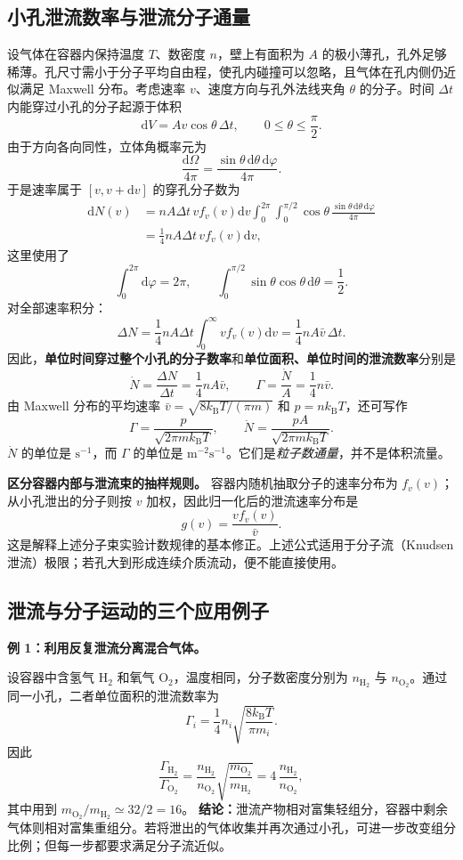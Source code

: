 \documentclass[11pt,a4paper,openany]{ctexbook}
\newcommand{\dd}{\mathrm d}
\newcommand{\kb}{k_{\mathrm B}}
\begin{document}
\subsection*{小孔泄流数率与泄流分子通量}
设气体在容器内保持温度 $T$、数密度 $n$，壁上有面积为 $A$ 的极小薄孔，孔外足够稀薄。孔尺寸需小于分子平均自由程，使孔内碰撞可以忽略，且气体在孔内侧仍近似满足 Maxwell 分布。考虑速率 $v$、速度方向与孔外法线夹角 $\theta$ 的分子。时间 $\Delta t$ 内能穿过小孔的分子起源于体积
\[
\dd V=A v\cos\theta\,\Delta t,\qquad 0\le\theta\le\frac{\pi}{2}.
\]
由于方向各向同性，立体角概率元为
\[
\frac{\dd\Omega}{4\pi}
=\frac{\sin\theta\,\dd\theta\,\dd\varphi}{4\pi}.
\]
于是速率属于 $[v,v+\dd v]$ 的穿孔分子数为
\[
\begin{aligned}
\dd N(v)
&=nA\Delta t\,v f_v(v)\dd v
\int_0^{2\pi}\!\!\int_0^{\pi/2}
\cos\theta\,\frac{\sin\theta\,\dd\theta\,\dd\varphi}{4\pi}\\
&=\frac14 nA\Delta t\,v f_v(v)\dd v,
\end{aligned}
\]
这里使用了
\[
\int_0^{2\pi}\dd\varphi=2\pi,\qquad
\int_0^{\pi/2}\sin\theta\cos\theta\,\dd\theta=\frac12.
\]
对全部速率积分：
\[
\Delta N=\frac14nA\Delta t\int_0^\infty vf_v(v)\dd v
=\frac14nA\bar v\,\Delta t.
\]
因此，\textbf{单位时间穿过整个小孔的分子数率}和\textbf{单位面积、单位时间的泄流数率}分别是
\[
\boxed{\dot N=\frac{\Delta N}{\Delta t}=\frac14nA\bar v},
\qquad
\boxed{\Gamma=\frac{\dot N}{A}=\frac14n\bar v}.
\]
由 Maxwell 分布的平均速率
$\bar v=\sqrt{8\kb T/(\pi m)}$ 和 $p=n\kb T$，还可写作
\[
\Gamma=\frac{p}{\sqrt{2\pi m\kb T}},\qquad
\dot N=\frac{pA}{\sqrt{2\pi m\kb T}}.
\]
$\dot N$ 的单位是 $\mathrm{s^{-1}}$，而 $\Gamma$ 的单位是
$\mathrm{m^{-2}s^{-1}}$。它们是\emph{粒子数通量}，并不是体积流量。

\begin{notebox}
\textbf{区分容器内部与泄流束的抽样规则。}
容器内随机抽取分子的速率分布为 $f_v(v)$；从小孔泄出的分子则按 $v$ 加权，因此归一化后的泄流速率分布是
\[
g(v)=\frac{vf_v(v)}{\bar v}.
\]
这是解释上述分子束实验计数规律的基本修正。上述公式适用于分子流（Knudsen 泄流）极限；若孔大到形成连续介质流动，便不能直接使用。
\end{notebox}



\subsection*{泄流与分子运动的三个应用例子}
\begin{examplebox}
\textbf{例 1：利用反复泄流分离混合气体。}

设容器中含氢气 $\mathrm H_2$ 和氧气 $\mathrm O_2$，温度相同，分子数密度分别为 $n_{\mathrm H_2}$ 与 $n_{\mathrm O_2}$。通过同一小孔，二者单位面积的泄流数率为
\[
\Gamma_i=\frac14n_i\sqrt{\frac{8\kb T}{\pi m_i}}.
\]
因此
\[
\frac{\Gamma_{\mathrm H_2}}{\Gamma_{\mathrm O_2}}=
\frac{n_{\mathrm H_2}}{n_{\mathrm O_2}}
\sqrt{\frac{m_{\mathrm O_2}}{m_{\mathrm H_2}}}
=4\,\frac{n_{\mathrm H_2}}{n_{\mathrm O_2}},
\]
其中用到 $m_{\mathrm O_2}/m_{\mathrm H_2}\simeq32/2=16$。
\textbf{结论：}泄流产物相对富集轻组分，容器中剩余气体则相对富集重组分。若将泄出的气体收集并再次通过小孔，可进一步改变组分比例；但每一步都要求满足分子流近似。
\end{examplebox}
\end{document}
